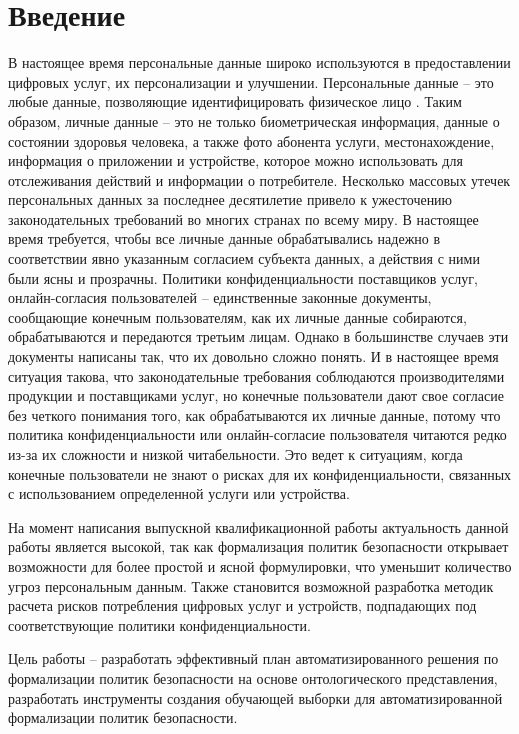 \documentclass[../main]{subfiles}
\begin{document}
\newpage
{}
{}
\section*{Введение}

В настоящее время персональные данные широко используются в предоставлении цифровых услуг, их персонализации и улучшении. Персональные данные -- это любые данные, позволяющие идентифицировать физическое лицо \cite{GDPR}. Таким образом, личные данные -- это не только биометрическая информация, данные о состоянии здоровья человека, а также фото абонента услуги, местонахождение, информация о приложении и устройстве, которое можно использовать для отслеживания действий и информации о потребителе. Несколько массовых утечек персональных данных за последнее десятилетие привело к ужесточению законодательных требований во многих странах по всему миру. В настоящее время требуется, чтобы все личные данные обрабатывались надежно в соответствии явно указанным согласием субъекта данных, а действия с ними были ясны и прозрачны. Политики конфиденциальности поставщиков услуг, онлайн-согласия пользователей -- единственные законные документы, сообщающие конечным пользователям, как их личные данные собираются, обрабатываются и передаются третьим лицам. Однако в большинстве случаев эти документы написаны так, что их довольно сложно понять. И в настоящее время ситуация такова, что законодательные требования  соблюдаются производителями продукции и поставщиками услуг, но конечные пользователи дают свое согласие без четкого понимания того, как обрабатываются их личные данные, потому что политика конфиденциальности или онлайн-согласие пользователя читаются редко из-за их сложности и низкой читабельности. Это ведет к ситуациям, когда конечные пользователи не знают о рисках для их конфиденциальности, связанных с использованием определенной услуги или устройства. 

На момент написания выпускной квалификационной работы актуальность данной работы является высокой, так как формализация политик безопасности открывает возможности для более простой и ясной формулировки, что уменьшит количество угроз персональным данным. Также становится возможной разработка методик расчета рисков потребления цифровых услуг и устройств, подпадающих под соответствующие политики конфиденциальности.

Цель работы -- разработать эффективный план автоматизированного решения по формализации политик безопасности на основе онтологического представления, разработать инструменты создания обучающей выборки для автоматизированной формализации политик безопасности. 
\end{document}
